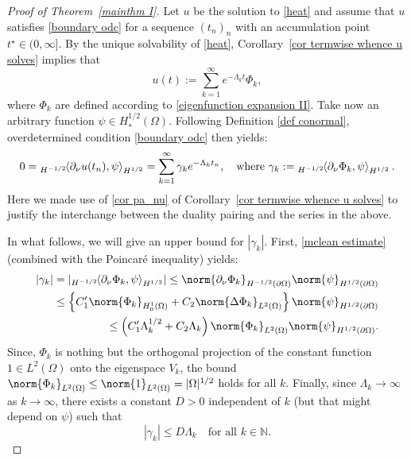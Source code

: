 \documentclass[a4paper,11pt]{article}
\newcommand\restr[2]{{%
\left.\kern-\nulldelimiterspace %
#1 %
\vphantom{|} %
\right|_{#2} %
}}
\newcommand{\pairing}[2]{
{}_{{H^{-1/2}}}\hspace*{-1mm}\left\langle #1, #2\right\rangle_{H^{1/2}}
}  %
\numberwithin{equation}{section}
\begin{document}
\begin{proof}[Proof of Theorem~\ref{mainthm I}]
Let $u$ be the solution to \eqref{heat} and assume that $u$ satisfies \eqref{boundary odc} for a sequence $(t_n)_n$ with an accumulation point $t^\star\in (0,\infty]$. By the unique solvability of \eqref{heat}, Corollary~\ref{cor termwise whence u solves} implies that
\begin{equation*}
    u(t):=\sum_{k=1}^\infty e^{-\Lambda_k t} \Phi_k, 
\end{equation*}
where $\Phi_k$ are defined according to \eqref{eigenfunction expansion II}.  
Take now an arbitrary function $\psi\in H_*^{1/2}(\Omega)$. Following Definition \ref{def conormal}, overdetermined condition \eqref{boundary odc} then yields:
\begin{equation}\label{conormal derivative against psi with zero average}
0= \pairing{\partial_\nu u(t_n)}{\psi} = \sum_{k=1}^\infty \gamma_k e^{-\Lambda_k t_n},\quad \text{where } \gamma_k:= \pairing{\partial_\nu \Phi_k}{\psi}.
\end{equation}
Here we made use of \eqref{cor pa_nu} of Corollary~\ref{cor termwise whence u solves} to justify the interchange between the duality pairing and the series in the above. 

In what follows, we will give an upper bound for $|\gamma_k|$.  First, \eqref{mclean estimate} (combined with the Poincar\'e inequality) yields:
\begin{equation*}\label{estimate gamma_k}
\begin{aligned}
|\gamma_k|=\left|\pairing{\partial_\nu \Phi_k}{\psi}\right|\le \norm{\partial_\nu \Phi_k}_{H^{-1/2}(\partial\Omega)}\norm{\psi}_{H^{1/2}(\partial\Omega)}\\
\le \left\{ C_1'\norm{\Phi_k}_{H_0^1(\Omega)} + C_2\norm{\Delta\Phi_k}_{L^2(\Omega)}        \right\}\norm{\psi}_{H^{1/2}(\partial\Omega)}\\
\le\left( C_1' \Lambda_k^{1/2}+C_2\Lambda_k   \right) \norm{\Phi_k}_{L^2(\Omega)} \norm{\psi}_{H^{1/2}(\partial\Omega)}.
\end{aligned}
\end{equation*}
Since, $\Phi_k$ is nothing but the orthogonal projection of the constant function $1\in L^2(\Omega)$ onto the eigenspace $V_k$, the bound $\norm{\Phi_k}_{L^2(\Omega)}\le \norm{1}_{L^2(\Omega)}=|\Omega|^{1/2}$ holds for all $k$. Finally, since $\Lambda_k\to \infty$ as $k\to\infty$, there exists a constant $D>0$ independent of $k$ (but that might depend on $\psi$) such that 
\begin{equation}\label{bounds on gamma_k}
    |\gamma_k|\le D \Lambda_k \quad \text{for all }k\in \mathbb{N}.
\end{equation}


\end{proof}
\end{document}
